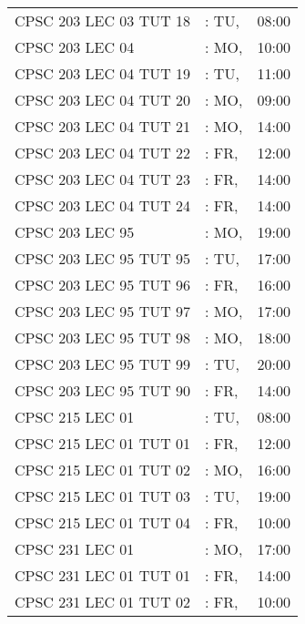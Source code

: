 \documentclass[11pt]{article}
\begin{document}
\begin{longtable}{l l r}
CPSC 203 LEC 03 TUT 18        &\hspace*{1.5cm}: TU,& 08:00\tabularnewline
CPSC 203 LEC 04               &\hspace*{1.5cm}: MO,& 10:00\tabularnewline
CPSC 203 LEC 04 TUT 19        &\hspace*{1.5cm}: TU,& 11:00\tabularnewline
CPSC 203 LEC 04 TUT 20        &\hspace*{1.5cm}: MO,& 09:00\tabularnewline
CPSC 203 LEC 04 TUT 21        &\hspace*{1.5cm}: MO,& 14:00\tabularnewline
CPSC 203 LEC 04 TUT 22        &\hspace*{1.5cm}: FR,& 12:00\tabularnewline
CPSC 203 LEC 04 TUT 23        &\hspace*{1.5cm}: FR,& 14:00\tabularnewline
CPSC 203 LEC 04 TUT 24        &\hspace*{1.5cm}: FR,& 14:00\tabularnewline
CPSC 203 LEC 95               &\hspace*{1.5cm}: MO,& 19:00\tabularnewline
CPSC 203 LEC 95 TUT 95        &\hspace*{1.5cm}: TU,& 17:00\tabularnewline
CPSC 203 LEC 95 TUT 96        &\hspace*{1.5cm}: FR,& 16:00\tabularnewline
CPSC 203 LEC 95 TUT 97        &\hspace*{1.5cm}: MO,& 17:00\tabularnewline
CPSC 203 LEC 95 TUT 98        &\hspace*{1.5cm}: MO,& 18:00\tabularnewline
CPSC 203 LEC 95 TUT 99        &\hspace*{1.5cm}: TU,& 20:00\tabularnewline
CPSC 203 LEC 95 TUT 90        &\hspace*{1.5cm}: FR,& 14:00\tabularnewline
CPSC 215 LEC 01               &\hspace*{1.5cm}: TU,& 08:00\tabularnewline
CPSC 215 LEC 01 TUT 01        &\hspace*{1.5cm}: FR,& 12:00\tabularnewline
CPSC 215 LEC 01 TUT 02        &\hspace*{1.5cm}: MO,& 16:00\tabularnewline
CPSC 215 LEC 01 TUT 03        &\hspace*{1.5cm}: TU,& 19:00\tabularnewline
CPSC 215 LEC 01 TUT 04        &\hspace*{1.5cm}: FR,& 10:00\tabularnewline
CPSC 231 LEC 01               &\hspace*{1.5cm}: MO,& 17:00\tabularnewline
CPSC 231 LEC 01 TUT 01        &\hspace*{1.5cm}: FR,& 14:00\tabularnewline
CPSC 231 LEC 01 TUT 02        &\hspace*{1.5cm}: FR,& 10:00\tabularnewline

\end{longtable}
\end{document}
